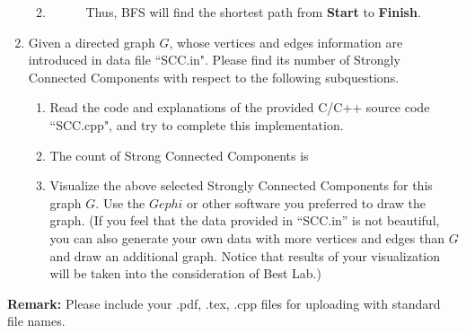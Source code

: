 \documentclass[12pt,a4paper]{article}
\makeatletter
\newtheorem*{solution}{Solution}
\theoremstyle{definition}
\renewenvironment{solution}[1][Solution] {\par\pushQED{\qed}\normalfont\topsep6\p@\@plus6\p@\relax\trivlist\item[\hskip\labelsep\bfseries#1\@addpunct{.}]\ignorespaces}{\popQED\endtrivlist\@endpefalse} \makeatother
\makeatother
\begin{document}
\begin{enumerate}
\begin{enumerate}
\begin{solution}
\begin{description}
                Thus, BFS will find the shortest path from \textbf{Start} to \textbf{Finish}.
                
            \end{description}
        \end{solution}
    \end{enumerate}
	
	\item Given a directed graph $G$, whose vertices and edges information are introduced in data file ``SCC.in". Please find its number of Strongly Connected Components with respect to the following subquestions.
    
    \begin{enumerate}
    	\item Read the code and explanations of the provided C/C++ source code ``SCC.cpp", and try to complete this implementation.
    	\begin{solution}
            The count of Strong Connected Components is
            \begin{tcolorbox}
                
            \end{tcolorbox}
        \end{solution}
    	\item Visualize the above selected Strongly Connected Components for this graph $G$. Use the $Gephi$ or other software you preferred to draw the graph. {\color{blue}(If you feel that the data provided in ``SCC.in'' is not beautiful, you can also generate your own data with more vertices and edges than $G$ and draw an additional graph. Notice that results of your visualization will be taken into the consideration of Best Lab.)}
    \end{enumerate}	
\end{enumerate}



\textbf{Remark:} Please include your .pdf, .tex, .cpp files for uploading with standard file names.
\newpage


\end{document}
